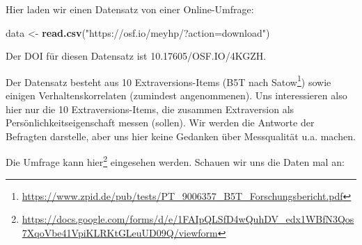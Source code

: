 \documentclass[12pt,ngerman,]{book}
\newenvironment{Shaded}{\begin{snugshade}}{\end{snugshade}}
\newcommand{\KeywordTok}[1]{\textcolor[rgb]{0.13,0.29,0.53}{\textbf{{#1}}}}
\newcommand{\StringTok}[1]{\textcolor[rgb]{0.31,0.60,0.02}{{#1}}}
\newcommand{\NormalTok}[1]{{#1}}
\let\rmarkdownfootnote\footnote%
\def\footnote{\protect\rmarkdownfootnote}
\renewenvironment{Shaded}{\begin{kframe}}{\end{kframe}}
\begin{document}
Hier laden wir einen Datensatz von einer Online-Umfrage:

\begin{Shaded}
\begin{Highlighting}[]
\NormalTok{data <-}\StringTok{ }\KeywordTok{read.csv}\NormalTok{(}\StringTok{"https://osf.io/meyhp/?action=download"}\NormalTok{)}
\end{Highlighting}
\end{Shaded}

Der DOI für diesen Datensatz ist 10.17605/OSF.IO/4KGZH.

Der Datensatz besteht aus 10 Extraversions-Items (B5T nach
Satow\footnote{\url{https://www.zpid.de/pub/tests/PT_9006357_B5T_Forschungsbericht.pdf}})
sowie einigen Verhaltenskorrelaten (zumindest angenommenen). Uns
interessieren also hier nur die 10 Extraversions-Items, die zusammen
Extraversion als Persönlichkeitseigenschaft messen (sollen). Wir werden
die Antworte der Befragten darstelle, aber uns hier keine Gedanken über
Messqualität u.a. machen.

Die Umfrage kann hier\footnote{\url{https://docs.google.com/forms/d/e/1FAIpQLSfD4wQuhDV_edx1WBfN3Qos7XqoVbe41VpiKLRKtGLeuUD09Q/viewform}}
eingesehen werden. Schauen wir uns die Daten mal an:
\end{document}
